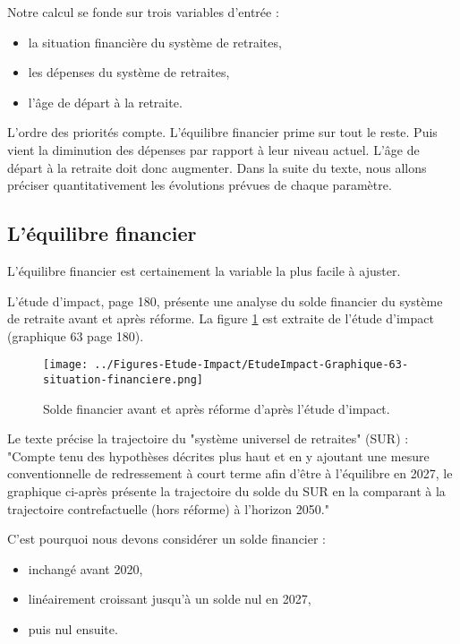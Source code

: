 \documentclass[10pt]{article}
\begin{document}
Notre calcul se fonde sur trois variables d'entrée :
\begin{itemize}
\item la situation financière du système de retraites, 
\item les dépenses du système de retraites, 
\item l'âge de départ à la retraite. 
\end{itemize}

L'ordre des priorités compte. 
L'équilibre financier prime sur tout le reste. 
Puis vient la diminution des dépenses par rapport à leur niveau actuel. 
L'âge de départ à la retraite doit donc augmenter. 
Dans la suite du texte, nous allons préciser quantitativement 
les évolutions prévues de chaque paramètre. 


\subsection{L'équilibre financier}

L'équilibre financier est certainement la variable 
la plus facile à ajuster. 

L'étude d'impact, page 180, présente une analyse du solde financier du système de retraite 
avant et après réforme.
La figure \ref{fig-solde-etude-impact} est extraite de l'étude d'impact 
(graphique 63 page 180). 

\begin{figure}
\begin{center}
\texttt{[image: ../Figures-Etude-Impact/EtudeImpact-Graphique-63-situation-financiere.png]}
\end{center}
\caption{Solde financier avant et après réforme d'après l'étude d'impact.}
\label{fig-solde-etude-impact}
\end{figure}

Le texte précise la trajectoire du "système universel de retraites" (SUR) : 
"Compte tenu des hypothèses décrites plus haut 
et en y ajoutant une mesure conventionnelle de redressement à court 
terme afin d’être à l’équilibre en 2027, le graphique ci-après présente 
la trajectoire du solde du SUR en la comparant à la trajectoire 
contrefactuelle (hors réforme) à l’horizon 2050."

C'est pourquoi nous devons considérer un solde financier :
\begin{itemize}
\item inchangé avant 2020,
\item linéairement croissant jusqu'à un solde nul en 2027,
\item puis nul ensuite.
\end{itemize}
\end{document}

